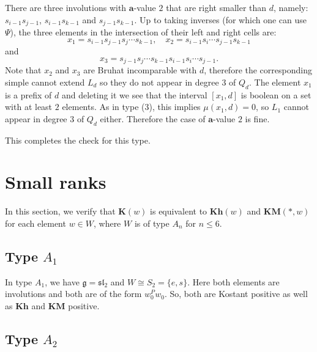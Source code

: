 \documentclass[a4paper]{amsart}
\def\HK#1{\textcolor[rgb]{.75,0.00,0.00}{[HK: #1]}}
\begin{document}
There are three involutions with $\mathbf{a}$-value $2$ that are right smaller
than $d$, namely: $s_{i-1}s_{j-1}$, $s_{i-1}s_{k-1}$ and $s_{j-1}s_{k-1}$.
Up to taking inverses (for which one can use $\Psi$), the three elements in the
intersection of their left and right cells are:
\begin{displaymath}
x_1= s_{i-1}s_{j-1}s_{j}\cdots s_{k-1},\quad
x_2= s_{i-1}s_{i}\cdots s_{j-1}s_{k-1}
\end{displaymath}
and 
\begin{displaymath}
x_3= s_{j-1}s_{j}\cdots s_{k-1}s_{i-1}s_{i}\cdots s_{j-1}.
\end{displaymath}
Note that $x_2$ and $x_3$ are Bruhat incomparable with $d$,
therefore the corresponding simple cannot extend $L_d$ so they
do not appear in degree $3$ of $Q_d$. The element $x_1$ is a prefix of $d$
and deleting it we see that the interval $[x_1,d]$ is boolean on a set
with at least $2$ elements. As in type (3), this implies
$\mu(x_1,d)=0$, so $L_1$ cannot appear in degree $3$ of $Q_d$ either.
Therefore the case of $\mathbf{a}$-value $2$ is fine.

This completes the check for this type.


\section{Small ranks}\label{s5}
In this section, we verify that  $\mathbf{K}(w)$ is equivalent to $\mathbf{Kh}(w)$ and $\mathbf{KM}(*,w)$ for each element $w\in W$, where $W$ is of type $A_n$ for $n\leq 6$. 

\subsection{Type $A_1$}\label{s5.1}

In type $A_1$, we have $\mathfrak{g}=\mathfrak{sl}_2$
and $W\cong S_2=\{e,s\}$. Here both elements are
involutions and both are of the form
$w_0^Pw_0$. So, both are Kostant positive
as well as $\mathbf{Kh}$ and $\mathbf{KM}$ positive.

\subsection{Type $A_2$}\label{s5.2}
\end{document}
